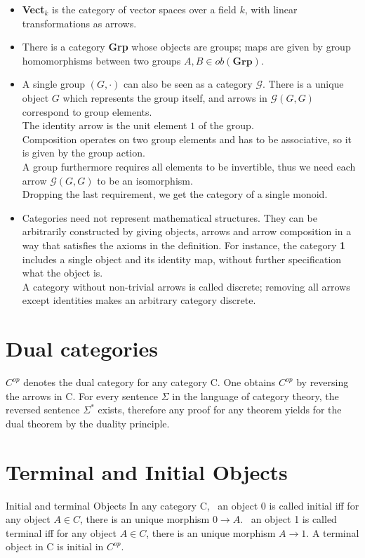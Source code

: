 \begin {itemize}
  \item \textbf{Vect$_k$} is the category of vector spaces over a field $k$, with linear transformations as arrows.
  
  \item There is a category \textbf{Grp} whose objects are groups; maps are given by group homomorphisms between two groups $A,B \in ob(\textbf{Grp}).$ 
  
  \item A single group $(G, \cdot)$ can also be seen as a category $\mathcal{G}$. There is a unique object $G$ which represents the group itself, and arrows in $\mathcal{G}(G, G)$  correspond to group elements. 
  \\ The identity arrow is the unit element $1$ of the group.
  \\ Composition operates on two group elements and has to be associative, so it is given by the group action.
  \\ A group furthermore requires all elements to be invertible, thus we need each arrow $\mathcal{G}(G, G)$ to be an isomorphism.
  \\ Dropping the last requirement, we get the category of a single monoid.
  
 \item Categories need not represent mathematical structures. They can be arbitrarily constructed by giving objects, arrows and arrow composition in a way that satisfies the axioms in the definition. For instance, the category \textbf{1} includes a single object and its identity map, without further specification what the object is. 
 \\ A category without non-trivial arrows is called discrete; removing all arrows except identities makes an arbitrary category discrete.
 \end {itemize}

 \section {Dual categories}

 $C^{op}$ denotes the dual category for any category C. One obtains $C^{op}$ by reversing the arrows in C. For every sentence $\Sigma$ in the language of category theory, the reversed sentence $\Sigma^*$ exists, therefore any proof for any theorem yields for the dual theorem by the duality principle.  

\section {Terminal and Initial Objects}
\begin {definition}{Initial and terminal Objects}
  In any category C,
  \ an object 0 is called initial iff for any object $A \in C$, there is an unique morphism $0 \to A$.
  \ an object 1 is called terminal iff for any object $A \in C$, there is an unique morphism $A \to 1$. A terminal object in C is initial in $C^{op}$.

\end {definition}

